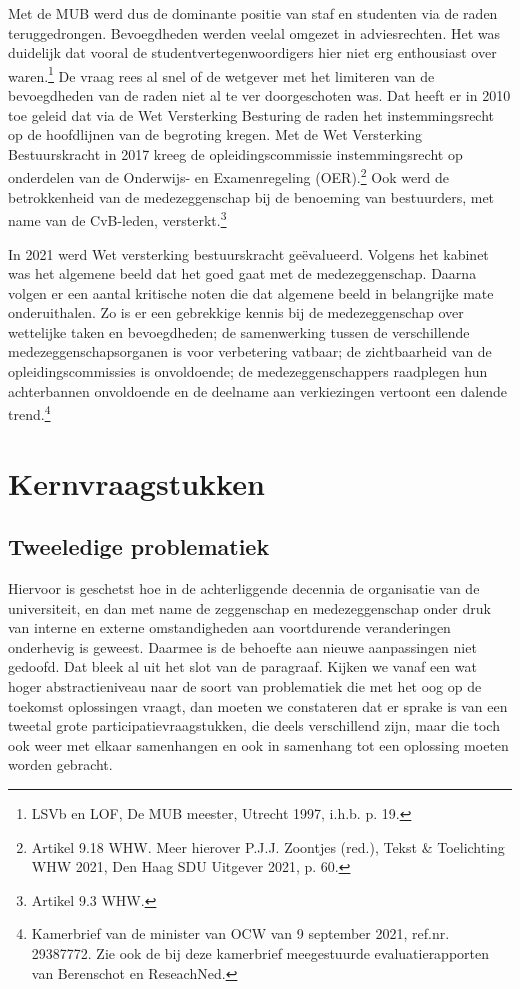 \documentclass[smallauthor, chapterhaspagenum, nochapterinheader, pagenuminheader,  bigchapnum,medium2, tocpages,  garamond, titleinheader]{jote-book}
\begin{document}
	Met de MUB werd dus de dominante positie van staf en studenten via de raden teruggedrongen. Bevoegdheden werden veelal omgezet in adviesrechten. Het was duidelijk dat vooral de studentvertegenwoordigers hier niet erg enthousiast over waren.\footnote{LSVb en LOF, De MUB meester, Utrecht 1997, i.h.b. p. 19.} De vraag rees al snel of de wetgever met het limiteren van de bevoegdheden van de raden niet al te ver doorgeschoten was. Dat heeft er in 2010 toe geleid dat via de Wet Versterking Besturing de raden het instemmingsrecht op de hoofdlijnen van de begroting kregen. Met de Wet Versterking Bestuurskracht in 2017 kreeg de opleidingscommissie instemmingsrecht op onderdelen van de Onderwijs- en Examenregeling (OER).\footnote{Artikel 9.18 WHW. Meer hierover P.J.J. Zoontjes (red.), Tekst \& Toelichting WHW 2021, Den Haag SDU Uitgever 2021, p. 60.} Ook werd de betrokkenheid van de medezeggenschap bij de benoeming van bestuurders, met name van de CvB-leden, versterkt.\footnote{Artikel 9.3 WHW.}



	In 2021 werd Wet versterking bestuurskracht geëvalueerd. Volgens het kabinet was het algemene beeld dat het goed gaat met de medezeggenschap. Daarna volgen er een aantal kritische noten die dat algemene beeld in belangrijke mate onderuithalen. Zo is er een gebrekkige kennis bij de medezeggenschap over wettelijke taken en bevoegdheden; de samenwerking tussen de verschillende medezeggenschapsorganen is voor verbetering vatbaar; de zichtbaarheid van de opleidingscommissies is onvoldoende; de medezeggenschappers raadplegen hun achterbannen onvoldoende en de deelname aan verkiezingen vertoont een dalende trend.\footnote{Kamerbrief van de minister van OCW van 9 september 2021, ref.nr. 29387772. Zie ook de bij deze kamerbrief meegestuurde evaluatierapporten van Berenschot en ReseachNed.}



	\section{Kernvraagstukken}



	\subsection{Tweeledige problematiek}



	Hiervoor is geschetst hoe in de achterliggende decennia de organisatie van de universiteit, en dan met name de zeggenschap en medezeggenschap onder druk van interne en externe omstandigheden aan voortdurende veranderingen onderhevig is geweest. Daarmee is de behoefte aan nieuwe aanpassingen niet gedoofd. Dat bleek al uit het slot van de paragraaf. Kijken we vanaf een wat hoger abstractieniveau naar de soort van problematiek die met het oog op de toekomst oplossingen vraagt, dan moeten we constateren dat er sprake is van een tweetal grote participatievraagstukken, die deels verschillend zijn, maar die toch ook weer met elkaar samenhangen en ook in samenhang tot een oplossing moeten worden gebracht.
\end{document}
